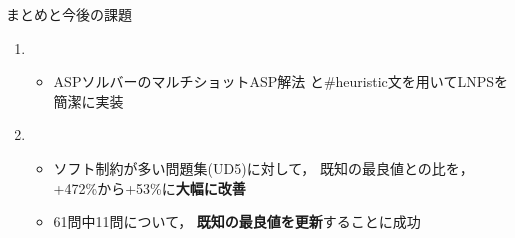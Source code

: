 \documentclass[11pt,dvipdfmx]{beamer}
\begin{document}
\begin{frame}{まとめと今後の課題}
  \begin{enumerate}
  \item {}
    \begin{itemize}
    \item ASPソルバー{\clingo}のマルチショットASP解法
      と\textsf{\#heuristic}文を用いてLNPSを簡潔に実装
    \end{itemize}
  \item {}
    \begin{itemize}
      \item ソフト制約が多い問題集(UD5)に対して，
        既知の最良値との比を，+472\%から+53\%に\alert{\bf 大幅に改善}
      \item 61問中11問について，
        \alert{\bf 既知の最良値を更新}することに成功
    \end{itemize}
  \end{enumerate}


\end{frame}
\end{document}
